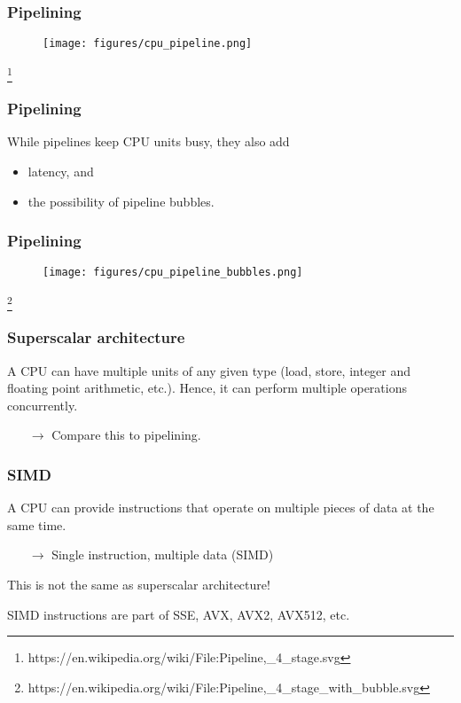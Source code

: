 \documentclass[12pt,t]{beamer}
\newcommand\blfootnote[1]{%
  \begingroup
  \renewcommand\thefootnote{}\footnote{\tiny #1}%
  \addtocounter{footnote}{-1}%
  \endgroup
}
\newcommand{\conclude}[1]{%
  \begin{itemize}
    \item[$\rightarrow$]#1
  \end{itemize}
}
\begin{document}
  \begin{frame}[fragile]
    \frametitle{Pipelining}

    \begin{figure}
      \centering
      \texttt{[image: figures/cpu\_pipeline.png]}
    \end{figure}
    \blfootnote{https://en.wikipedia.org/wiki/File:Pipeline,\_4\_stage.svg}
  \end{frame}

  \begin{frame}[fragile]
    \frametitle{Pipelining}

    While pipelines keep CPU units busy, they also add
    \begin{itemize}
      \item latency, and
      \item the possibility of pipeline bubbles.
    \end{itemize}
  \end{frame}

  \begin{frame}[fragile]
    \frametitle{Pipelining}

    \begin{figure}
      \centering
      \texttt{[image: figures/cpu\_pipeline\_bubbles.png]}
    \end{figure}
    \blfootnote{https://en.wikipedia.org/wiki/File:Pipeline,\_4\_stage\_with\_bubble.svg}
  \end{frame}

  \begin{frame}[fragile]
    \frametitle{Superscalar architecture}

    A CPU can have multiple units of any given type (load, store, integer and floating point arithmetic, etc.).
    Hence, it can perform multiple operations concurrently.

    \conclude{Compare this to pipelining.}
  \end{frame}

  \begin{frame}[fragile]
    \frametitle{SIMD}

    A CPU can provide instructions that operate on multiple pieces of data at the same time.
    \conclude {Single instruction, multiple data (SIMD)}

    This is not the same as superscalar architecture!

    SIMD instructions are part of SSE, AVX, AVX2, AVX512, etc.
  \end{frame}
\end{document}
